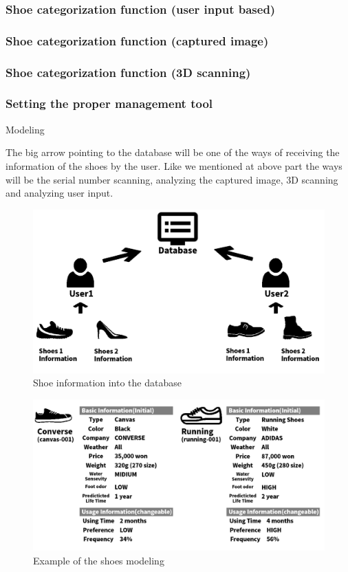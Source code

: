 \documentclass[conference]{IEEEtran}
\begin{document}
\subsubsection{Shoe categorization function (user input based)}
\subsubsection{Shoe categorization function (captured image)}
\subsubsection{Shoe categorization function (3D scanning)}
\subsubsection{Setting the proper management tool}Modeling

The big arrow pointing to the database will be one of the ways of receiving the information of the shoes by the user. Like we mentioned at above part the ways will be the serial number scanning, analyzing the captured image, 3D scanning and analyzing user input.

\begin{figure}[H]
\begin{center}
    \includegraphics[scale=0.28]{management1}
    \caption{Shoe information into the database} \label{fig:label}
\end{center}
\end{figure}
\begin{figure}[H]
\begin{center}
    \includegraphics[scale=0.24]{management2}
    \caption{Example of the shoes modeling } \label{fig:label}
\end{center}
\end{figure}
\end{document}
